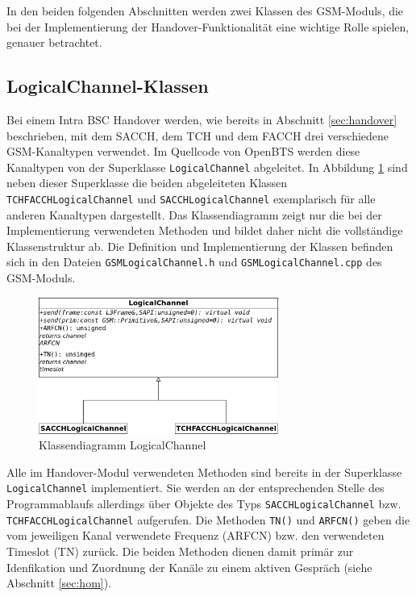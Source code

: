 In den beiden folgenden Abschnitten werden zwei Klassen des GSM-Moduls, die bei der Implementierung der Handover-Funktionalität eine wichtige Rolle spielen, genauer betrachtet.

\subsection{LogicalChannel-Klassen}

Bei einem Intra BSC Handover werden, wie bereits in Abschnitt \ref{sec:handover} beschrieben, mit dem SACCH, dem TCH und dem FACCH drei verschiedene GSM-Kanaltypen verwendet. Im Quellcode von OpenBTS werden diese Kanaltypen von der Superklasse \lstinline{LogicalChannel} abgeleitet. In Abbildung \ref{fig:logchan} sind neben dieser Superklasse die beiden abgeleiteten Klassen \lstinline{TCHFACCHLogicalChannel} und \lstinline{SACCHLogicalChannel} exemplarisch für alle anderen Kanaltypen dargestellt. Das Klassendiagramm zeigt nur die bei der Implementierung verwendeten Methoden und bildet daher nicht die vollständige Klassenstruktur ab. Die Definition und Implementierung der Klassen befinden sich in den Dateien \lstinline{GSMLogicalChannel.h} und \lstinline{GSMLogicalChannel.cpp} des GSM-Moduls.

\begin{figure}[h!]
  \centering
  \includegraphics[width=0.7\textwidth]{img/lc}
  \caption{Klassendiagramm LogicalChannel}
  \label{fig:logchan}
\end{figure}

Alle im Handover-Modul verwendeten Methoden sind bereits in der Superklasse \lstinline{LogicalChannel} implementiert. Sie werden an der entsprechenden Stelle des Programmablaufs allerdings über Objekte des Typs \lstinline{SACCHLogicalChannel} bzw. \lstinline{TCHFACCHLogicalChannel} aufgerufen. Die Methoden \lstinline{TN()} und \lstinline{ARFCN()} geben die vom jeweiligen Kanal verwendete Frequenz (ARFCN) bzw. den verwendeten Timeslot (TN) zurück. Die beiden Methoden dienen damit primär zur Idenfikation und Zuordnung der Kanäle zu einem aktiven Gespräch (siehe Abschnitt \ref{sec:hom}).

